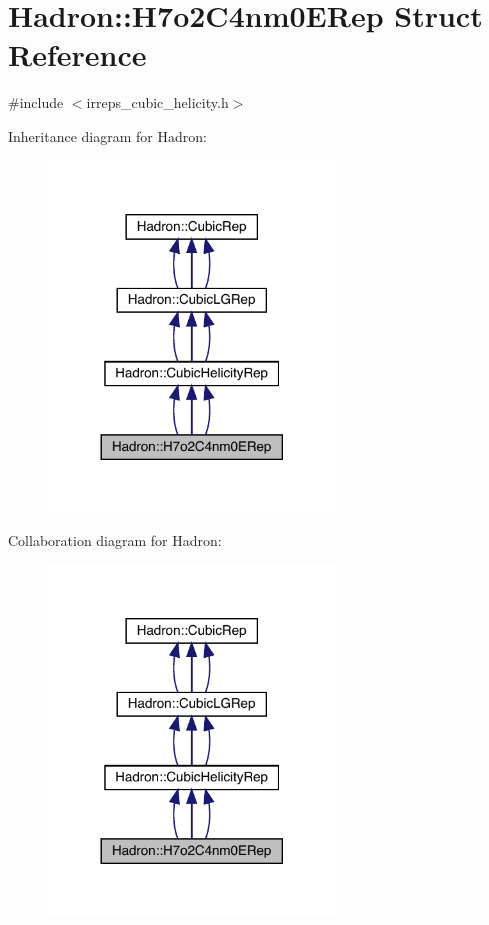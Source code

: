 \hypertarget{structHadron_1_1H7o2C4nm0ERep}{}\section{Hadron\+:\+:H7o2\+C4nm0\+E\+Rep Struct Reference}
\label{structHadron_1_1H7o2C4nm0ERep}


{\ttfamily \#include $<$irreps\+\_\+cubic\+\_\+helicity.\+h$>$}



Inheritance diagram for Hadron\+:
\nopagebreak
\begin{figure}[H]
\begin{center}
\leavevmode
\includegraphics[width=216pt]{d0/de7/structHadron_1_1H7o2C4nm0ERep__inherit__graph}
\end{center}
\end{figure}


Collaboration diagram for Hadron\+:
\nopagebreak
\begin{figure}[H]
\begin{center}
\leavevmode
\includegraphics[width=216pt]{d0/d12/structHadron_1_1H7o2C4nm0ERep__coll__graph}
\end{center}
\end{figure}
